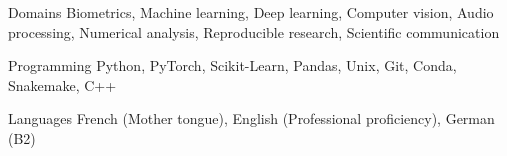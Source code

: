 

\begin{cvskills}

  \cvskill
    {Domains} %
    {Biometrics, Machine learning, Deep learning, Computer vision, Audio processing, Numerical analysis, Reproducible research, Scientific communication} %

  \cvskill
    {Programming} %
    {Python, PyTorch, Scikit-Learn, Pandas, Unix, Git, Conda, Snakemake, C++} %

  \cvskill
    {Languages} %
    {French (Mother tongue), English (Professional proficiency), German (B2)} %

\end{cvskills}
